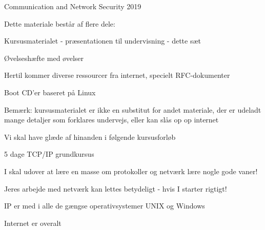 \documentclass[20pt,landscape,a4paper,footrule]{foils}
\begin{document}


\mytitlepage
{Communication and Network Security}
{2019}


\label{reftest}
\begin{list1}
\item Dette materiale består af flere dele:
\begin{list2}
\item Kursusmaterialet - præsentationen til undervisning - dette sæt
\item Øvelseshæfte med øvelser
\end{list2}
\item Hertil kommer diverse ressourcer fra internet, specielt RFC-dokumenter
\item Boot CD'er baseret på Linux
\item Bemærk: kursusmaterialet er ikke en substitut for andet materiale, der er udeladt mange detaljer som forklares undervejs, eller kan slås op op internet
\end{list1}






\begin{list1}
\item Vi skal have glæde af hinanden i følgende kursusforløb
\begin{list2}
\item 5 dage TCP/IP grundkursus
\end{list2}
\item I skal udover at lære en masse om protokoller og netværk lære nogle gode vaner!
\item Jeres arbejde med netværk kan lettes betydeligt - hvis I starter rigtigt!
\end{list1}


\hlkprofil


\dagsplan


\begin{list1}
\item IP er med i alle de gængse operativsystemer UNIX og Windows
\item Internet er overalt
\end{list1}
\end{document}
